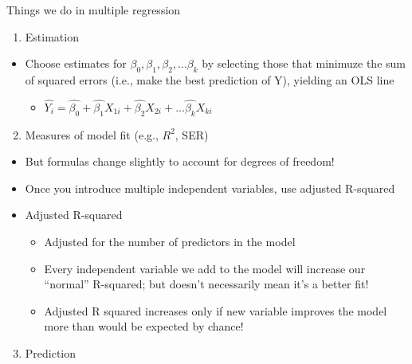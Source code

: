 \documentclass[8pt,ignorenonframetext,dvipsnames]{beamer}
\providecommand{\tightlist}{%
  \setlength{\itemsep}{0pt}\setlength{\parskip}{0pt}}
\let\olditem\item
\renewcommand{\item}{%
  \olditem\vspace{4pt}
}
\begin{document}
\begin{frame}{Things we do in multiple regression}
\protect\hypertarget{things-we-do-in-multiple-regression}{}

\begin{enumerate}
\tightlist
\item
  Estimation
\end{enumerate}

\begin{itemize}
\tightlist
\item
  Choose estimates for \(\beta_0, \beta_1, \beta_2, ... \beta_k\) by
  selecting those that minimuze the sum of squared errors (i.e., make
  the best prediction of Y), yielding an OLS line

  \begin{itemize}
  \tightlist
  \item
    \(\hat{Y_i} = \hat{\beta_0} + \hat{\beta_1} X_{1i} + \hat{\beta_2} X_{2i} + ... \hat{\beta_k} X_{ki}\)
  \end{itemize}
\end{itemize}

\begin{enumerate}
\setcounter{enumi}{1}
\tightlist
\item
  Measures of model fit (e.g., \(R^2\), SER)
\end{enumerate}

\begin{itemize}
\tightlist
\item
  But formulas change slightly to account for degrees of freedom!
\item
  Once you introduce multiple independent variables, use adjusted
  R-squared
\item
  Adjusted R-squared

  \begin{itemize}
  \tightlist
  \item
    Adjusted for the number of predictors in the model
  \item
    Every independent variable we add to the model will increase our
    ``normal'' R-squared; but doesn't necessarily mean it's a better
    fit!
  \item
    Adjusted R squared increases only if new variable improves the model
    more than would be expected by chance!
  \end{itemize}
\end{itemize}

\begin{enumerate}
\setcounter{enumi}{2}
\tightlist
\item
  Prediction
\end{enumerate}


\end{frame}
\end{document}
